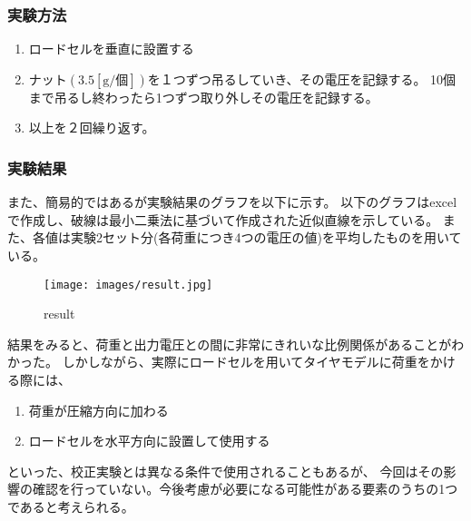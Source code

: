 \documentclass[twocolumn,a4j]{jsarticle}
\begin{document}
\subsubsection{実験方法}
\begin{enumerate}[(1)]
    \item ロードセルを垂直に設置する
    \item ナット$\left(3.5 \mathrm{\left[g/個\right]}\right)$を１つずつ吊るしていき、その電圧を記録する。
          10個まで吊るし終わったら1つずつ取り外しその電圧を記録する。
    \item 以上を２回繰り返す。
\end{enumerate}
\subsubsection{実験結果}
また、簡易的ではあるが実験結果のグラフを以下に示す。
以下のグラフはexcelで作成し、破線は最小二乗法に基づいて作成された近似直線を示している。
また、各値は実験2セット分(各荷重につき4つの電圧の値)を平均したものを用いている。
\begin{figure}[htbp]
    \begin{center}
        \texttt{[image: images/result.jpg]}
        \caption{result}
    \end{center}
\end{figure}
\newpage
結果をみると、荷重と出力電圧との間に非常にきれいな比例関係があることがわかった。
しかしながら、実際にロードセルを用いてタイヤモデルに荷重をかける際には、
\begin{enumerate}[(1)]
    \item 荷重が圧縮方向に加わる
    \item ロードセルを水平方向に設置して使用する
\end{enumerate}
といった、校正実験とは異なる条件で使用されることもあるが、
今回はその影響の確認を行っていない。今後考慮が必要になる可能性がある要素のうちの1つであると考えられる。\\
\end{document}

